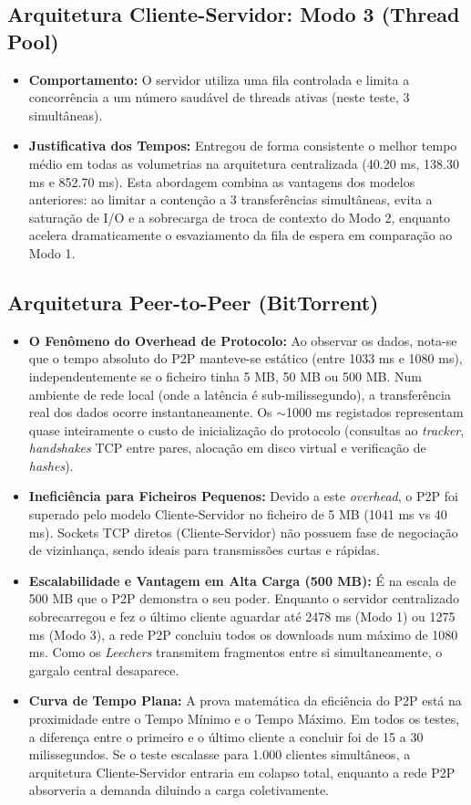 \documentclass[12pt, a4paper]{article}
\begin{document}
\subsection{Arquitetura Cliente-Servidor: Modo 3 (Thread Pool)}
\begin{itemize}
    \item \textbf{Comportamento:} O servidor utiliza uma fila controlada e limita a concorrência a um número saudável de threads ativas (neste teste, 3 simultâneas).
    \item \textbf{Justificativa dos Tempos:} Entregou de forma consistente o melhor tempo médio em todas as volumetrias na arquitetura centralizada (40.20 ms, 138.30 ms e 852.70 ms). Esta abordagem combina as vantagens dos modelos anteriores: ao limitar a contenção a 3 transferências simultâneas, evita a saturação de I/O e a sobrecarga de troca de contexto do Modo 2, enquanto acelera dramaticamente o esvaziamento da fila de espera em comparação ao Modo 1.
\end{itemize}

\subsection{Arquitetura Peer-to-Peer (BitTorrent)}
\begin{itemize}
    \item \textbf{O Fenômeno do Overhead de Protocolo:} Ao observar os dados, nota-se que o tempo absoluto do P2P manteve-se estático (entre 1033 ms e 1080 ms), independentemente se o ficheiro tinha 5 MB, 50 MB ou 500 MB. Num ambiente de rede local (onde a latência é sub-milissegundo), a transferência real dos dados ocorre instantaneamente. Os $\sim$1000 ms registados representam quase inteiramente o custo de inicialização do protocolo (consultas ao \textit{tracker}, \textit{handshakes} TCP entre pares, alocação em disco virtual e verificação de \textit{hashes}). 
    \item \textbf{Ineficiência para Ficheiros Pequenos:} Devido a este \textit{overhead}, o P2P foi superado pelo modelo Cliente-Servidor no ficheiro de 5 MB (1041 ms vs 40 ms). Sockets TCP diretos (Cliente-Servidor) não possuem fase de negociação de vizinhança, sendo ideais para transmissões curtas e rápidas.
    \item \textbf{Escalabilidade e Vantagem em Alta Carga (500 MB):} É na escala de 500 MB que o P2P demonstra o seu poder. Enquanto o servidor centralizado sobrecarregou e fez o último cliente aguardar até 2478 ms (Modo 1) ou 1275 ms (Modo 3), a rede P2P concluiu todos os downloads num máximo de 1080 ms. Como os \textit{Leechers} transmitem fragmentos entre si simultaneamente, o gargalo central desaparece.
    \item \textbf{Curva de Tempo Plana:} A prova matemática da eficiência do P2P está na proximidade entre o Tempo Mínimo e o Tempo Máximo. Em todos os testes, a diferença entre o primeiro e o último cliente a concluir foi de 15 a 30 milissegundos. Se o teste escalasse para 1.000 clientes simultâneos, a arquitetura Cliente-Servidor entraria em colapso total, enquanto a rede P2P absorveria a demanda diluindo a carga coletivamente.
\end{itemize}
\end{document}
